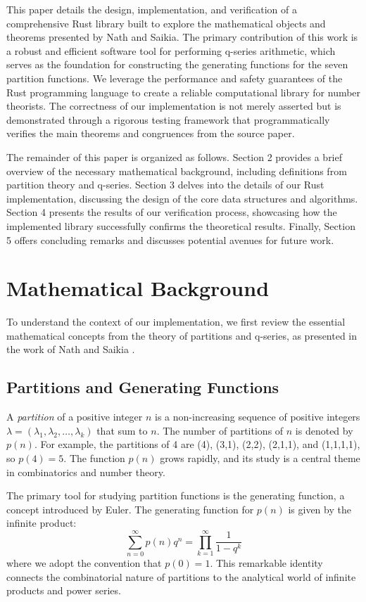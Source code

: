\documentclass{article}
\begin{document}
This paper details the design, implementation, and verification of a comprehensive Rust library built to explore the mathematical objects and theorems presented by Nath and Saikia. The primary contribution of this work is a robust and efficient software tool for performing q-series arithmetic, which serves as the foundation for constructing the generating functions for the seven partition functions. We leverage the performance and safety guarantees of the Rust programming language to create a reliable computational library for number theorists. The correctness of our implementation is not merely asserted but is demonstrated through a rigorous testing framework that programmatically verifies the main theorems and congruences from the source paper.

The remainder of this paper is organized as follows. Section 2 provides a brief overview of the necessary mathematical background, including definitions from partition theory and q-series. Section 3 delves into the details of our Rust implementation, discussing the design of the core data structures and algorithms. Section 4 presents the results of our verification process, showcasing how the implemented library successfully confirms the theoretical results. Finally, Section 5 offers concluding remarks and discusses potential avenues for future work.

\section{Mathematical Background}

To understand the context of our implementation, we first review the essential mathematical concepts from the theory of partitions and q-series, as presented in the work of Nath and Saikia \cite{nath2025arithmetic}.

\subsection{Partitions and Generating Functions}

A \textit{partition} of a positive integer $n$ is a non-increasing sequence of positive integers $\lambda = (\lambda_1, \lambda_2, \ldots, \lambda_k)$ that sum to $n$. The number of partitions of $n$ is denoted by $p(n)$. For example, the partitions of 4 are (4), (3,1), (2,2), (2,1,1), and (1,1,1,1), so $p(4)=5$. The function $p(n)$ grows rapidly, and its study is a central theme in combinatorics and number theory.

The primary tool for studying partition functions is the generating function, a concept introduced by Euler. The generating function for $p(n)$ is given by the infinite product:
\begin{equation}
\sum_{n=0}^{\infty} p(n)q^n = \prod_{k=1}^{\infty} \frac{1}{1-q^k}
\end{equation}
where we adopt the convention that $p(0)=1$. This remarkable identity connects the combinatorial nature of partitions to the analytical world of infinite products and power series.
\end{document}
